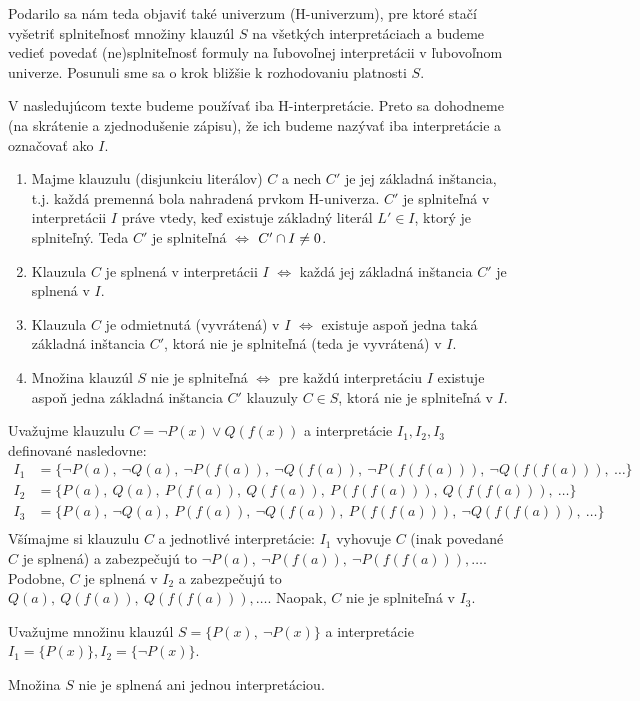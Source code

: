 Podarilo sa nám teda objaviť také univerzum (H-univerzum), pre ktoré
stačí vyšetriť splniteľnosť množiny klauzúl $S$ na všetkých
interpretáciach a budeme vedieť povedať (ne)splniteľnosť formuly na
ľubovoľnej interpretácii v ľubovoľnom univerze. Posunuli sme sa o krok
bližšie k rozhodovaniu platnosti $S$.

\begin{poznamka}
    V nasledujúcom texte budeme používať iba H-interpretácie.
    Preto sa dohodneme (na skrátenie a zjednodušenie zápisu), že
    ich budeme nazývať iba interpretácie a označovať ako $I$.
\end{poznamka}

\begin{poznamka}
    \noindent
    \begin{enumerate}
	\item Majme klauzulu (disjunkciu literálov) $C$
            a nech $C'$ je jej základná inštancia, t.j. 
            každá premenná bola nahradená prvkom H-univerza.
            $C'$ je splniteľná v interpretácii $I$
	    práve vtedy, keď existuje základný literál $L' \in I$,
            ktorý je splniteľný.
            Teda $C'$ je splniteľná $\iff$ $C' \cap I \ne 0$.            

	\item Klauzula $C$ je splnená v interpretácii $I$ $\iff$ každá jej
	základná inštancia $C'$ je splnená v $I$.

	\item Klauzula $C$ je odmietnutá (vyvrátená) v $I$ $\iff$ existuje
	aspoň jedna taká základná inštancia $C'$, ktorá 
        nie je splniteľná (teda je vyvrátená) v $I$.

	\item Množina klauzúl $S$ nie je splniteľná $\iff$ 
        pre každú interpretáciu $I$ existuje aspoň jedna základná inštancia 
        $C'$ klauzuly $C\in S$, ktorá nie je splniteľná v $I$.
    \end{enumerate}
\end{poznamka}

\begin{priklad}
    Uvažujme klauzulu $C=\neg P(x) \lor Q(f(x))$ a
    interpretácie $I_1,I_2,I_3$ definované nasledovne:
    \begin{align*}
        I_1 &= \{ \neg P(a),\ \neg Q(a),\ \neg P(f(a)),\ 
            \neg Q(f(a)),\ \neg P(f(f(a))),\ \neg Q(f(f(a))),\ \ldots \} \\
        I_2 &= \{ P(a),\ Q(a),\ P(f(a)),\ Q(f(a)),\ P(f(f(a))),\ 
            Q(f(f(a))),\ \ldots \} \\
        I_3 &= \{ P(a),\ \neg Q(a),\ P(f(a)),\ \neg Q(f(a)),\ 
            P(f(f(a))),\ \neg Q(f(f(a))),\ \ldots \} \\
    \end{align*}
    Všímajme si klauzulu $C$ a jednotlivé interpretácie:
    $I_1$ vyhovuje $C$ (inak povedané $C$ je splnená) a zabezpečujú to
    $\neg P(a),\ \neg P(f(a)),\ \neg P(f(f(a))), \dots$.
    Podobne, $C$ je splnená v $I_2$ a zabezpečujú to
    $Q(a),\ Q(f(a)),\ Q(f(f(a))), \dots$. Naopak, $C$ nie je
    splniteľná v $I_3$.
\end{priklad}

\begin{priklad}
    Uvažujme množinu klauzúl $S=\{P(x),\ \neg P(x)\}$ a
    interpretácie $I_1 = \{ P(x) \}, I_2 = \{ \neg P(x) \}$.

    Množina $S$ nie je splnená ani jednou interpretáciou.
\end{priklad}

